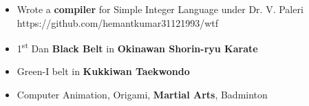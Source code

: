 \documentclass[a4paper]{cvtemplate}
\begin{document}
{\color{body}
\begin{itemize}
	\item Wrote a \textbf{compiler} for Simple Integer Language under Dr. V. Paleri \hfill {\footnotesize {https://github.com/hemantkumar31121993/wtf}}
	\item 1\textsuperscript{st} Dan \textbf{Black Belt} in \textbf{Okinawan Shorin-ryu Karate}
	\item Green-I belt  in \textbf{Kukkiwan Taekwondo} \phantom{g}
\end{itemize}
}

\begin{itemize}
	\item Computer Animation, Origami, \textbf{Martial Arts}, Badminton
\end{itemize}
\bigskip
\end{document}
